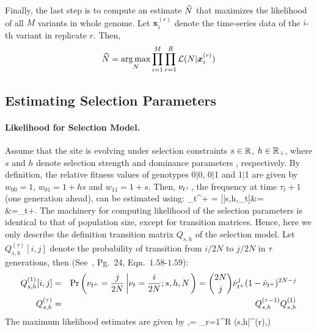 Finally, the last step is to compute an estimate $\widehat{N}$ that maximizes
the likelihood of all $M$ variants in whole genome. Let
$\bm{x}_i^{(r)}$ denote the time-series data of the $i$-th variant in
replicate $r$. Then,
\begin{equation}
 \widehat{N} =
\underset{N}{\arg \max} \prod_{i=1}^M  \prod_{r=1}^R{\cal L}(N|\bm{x}_i^{(r)})
\label{eq:mlen}
\end{equation}

\subsection{Estimating Selection Parameters}

\paragraph{Likelihood for Selection Model.}
Assume that the site is evolving under selection constraints $s\in
{\mathbb R}$, $h\in {\mathbb R}_+$, where $s$ and $h$ denote selection strength and 
dominance parameters ,
respectively. By definition, the relative fitness values of genotypes
0$|$0, 0$|$1 and 1$|$1 are given by $w_{00}=1$, $w_{01}=1+hs$ and
$w_{11}=1+s$.  Then, $\nu_{t^+}$, the frequency at time
$\tau_{t}+1$ (one generation ahead), can be estimated using: 
\beq 
\hat{\nu}_{t^+} =
[\nusp|s,h,\nu_t]&=\\
&=\nu_t+.
  \label{eq:transition}
\eeq
The machinery for computing likelihood of the selection parameters is 
identical to that of population size, except for transition matrices. Hence, here 
we only describe the definition transition matrix $Q_{s,h}$ of the selection 
model.
Let $Q^{(\tau)}_{s,h}[i,j]$ denote the
probability of transition from ${i}/{2N}$ to ${j}/{2N}$ in
$\tau$ generations, then (See~\cite{Ewens2012Mathematical}, Pg.~24, 
Eqn.~$1.58$-$1.59$):
\begin{eqnarray}
  Q^{(1)}_{s,h}[i,j] &=& \operatorname{Pr}\left(\nu_{t^+}=\frac{j}{2N} \left\lvert
      \nu_{t}=\frac{i}{2N};s,h,N \right .\right)={2N \choose j}
  \hat{\nu}_{t^+}^{j} (1-\hat{\nu}_{t^+})^{2N-j}\label{eq:Q1}\\
  Q^{(\tau)}_{s,h} &=& Q^{(\tau-1)}_{s,h}Q^{(1)}_{s,h}\label{eq:Qt}
  \label{eq:mkvs}   
\end{eqnarray}
The maximum likelihood estimates are given by
\beq
\hs,\hh =  \prod_{r=1}^R \Lc(s,h|^{(r)},\hN) 
\label{eq:mlesh}
\eeq

